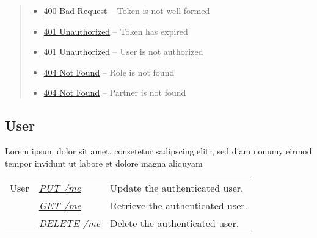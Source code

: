 \documentclass[letterpaper,10pt,english]{sphinxmanual}
\begin{document}
\begin{fulllineitems}
\begin{quote}
\begin{description}
\begin{itemize}
\item {} 
\href{http://www.w3.org/Protocols/rfc2616/rfc2616-sec10.html\#sec10.4.1}{400 Bad Request} -- Token is not well-formed

\item {} 
\href{http://www.w3.org/Protocols/rfc2616/rfc2616-sec10.html\#sec10.4.2}{401 Unauthorized} -- Token has expired

\item {} 
\href{http://www.w3.org/Protocols/rfc2616/rfc2616-sec10.html\#sec10.4.2}{401 Unauthorized} -- User is not authorized

\item {} 
\href{http://www.w3.org/Protocols/rfc2616/rfc2616-sec10.html\#sec10.4.5}{404 Not Found} -- Role is not found

\item {} 
\href{http://www.w3.org/Protocols/rfc2616/rfc2616-sec10.html\#sec10.4.5}{404 Not Found} -- Partner is not found

\end{itemize}

\end{description}\end{quote}

\end{fulllineitems}



\subsection{User}
\label{\detokenize{resources/user::doc}}\label{\detokenize{resources/user:user}}
Lorem ipsum dolor sit amet, consetetur sadipscing elitr, sed diam nonumy eirmod tempor invidunt ut labore et dolore magna aliquyam

\noindent\begin{tabulary}{\linewidth}{|L|L|L|}
\hline
{}\relax &\relax &\relax \\
\hline
User
&
{\hyperref[\detokenize{resources/user:put--me}]{\emph{PUT /me}}}
&
Update the authenticated user.
\\
\hline&
{\hyperref[\detokenize{resources/user:get--me}]{\emph{GET /me}}}
&
Retrieve the authenticated user.
\\
\hline&
{\hyperref[\detokenize{resources/user:delete--me}]{\emph{DELETE /me}}}
&
Delete the authenticated user.
\\
\hline\end{tabulary}
\end{document}
